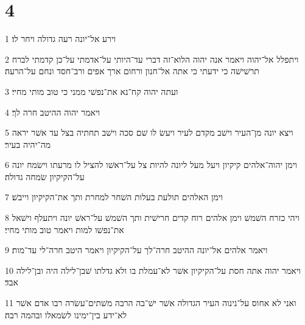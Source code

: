 \chapter{4}

\par 1 וירע אל־יונה רעה גדולה ויחר לו׃
\par 2 ויתפלל אל־יהוה ויאמר אנה יהוה הלוא־זה דברי עד־היותי על־אדמתי על־כן קדמתי לברח תרשׁישׁה כי ידעתי כי אתה אל־חנון ורחום ארך אפים ורב־חסד ונחם על־הרעה׃
\par 3 ועתה יהוה קח־נא את־נפשׁי ממני כי טוב מותי מחיי׃
\par 4 ויאמר יהוה ההיטב חרה לך׃
\par 5 ויצא יונה מן־העיר וישׁב מקדם לעיר ויעשׂ לו שׁם סכה וישׁב תחתיה בצל עד אשׁר יראה מה־יהיה בעיר׃
\par 6 וימן יהוה־אלהים קיקיון ויעל מעל ליונה להיות צל על־ראשׁו להציל לו מרעתו וישׂמח יונה על־הקיקיון שׂמחה גדולה׃
\par 7 וימן האלהים תולעת בעלות השׁחר למחרת ותך את־הקיקיון וייבשׁ׃
\par 8 ויהי כזרח השׁמשׁ וימן אלהים רוח קדים חרישׁית ותך השׁמשׁ על־ראשׁ יונה ויתעלף וישׁאל את־נפשׁו למות ויאמר טוב מותי מחיי׃
\par 9 ויאמר אלהים אל־יונה ההיטב חרה־לך על־הקיקיון ויאמר היטב חרה־לי עד־מות׃
\par 10 ויאמר יהוה אתה חסת על־הקיקיון אשׁר לא־עמלת בו ולא גדלתו שׁבן־לילה היה ובן־לילה אבד׃
\par 11 ואני לא אחוס על־נינוה העיר הגדולה אשׁר ישׁ־בה הרבה משׁתים־עשׂרה רבו אדם אשׁר לא־ידע בין־ימינו לשׂמאלו ובהמה רבה׃


